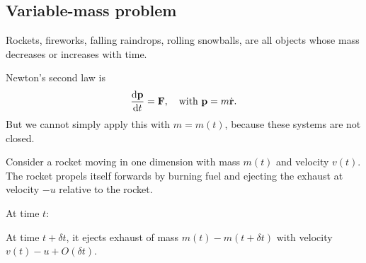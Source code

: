 \documentclass[a4paper]{article}
\begin{document}
\subsection{Variable-mass problem}
Rockets, fireworks, falling raindrops, rolling snowballs, are all objects whose mass decreases or increases with time.

Newton's second law is
\[
  \frac{\mathrm{d} \mathbf{p}}{\mathrm{d} t} = \mathbf{F},\quad\text{with }\mathbf{p} = m\dot{\mathbf{r}}.
\]
But we cannot simply apply this with $m = m(t)$, because these systems are not closed.

Consider a rocket moving in one dimension with mass $m(t)$ and velocity $v(t)$. The rocket propels itself forwards by burning fuel and ejecting the exhaust at velocity $-u$ relative to the rocket.

At time $t$: 
\begin{center}
\end{center}
At time $t + \delta t$, it ejects exhaust of mass $m(t) - m(t + \delta t)$ with velocity $v(t) - u + O(\delta t)$.

\begin{center}
\end{center}
\end{document}

